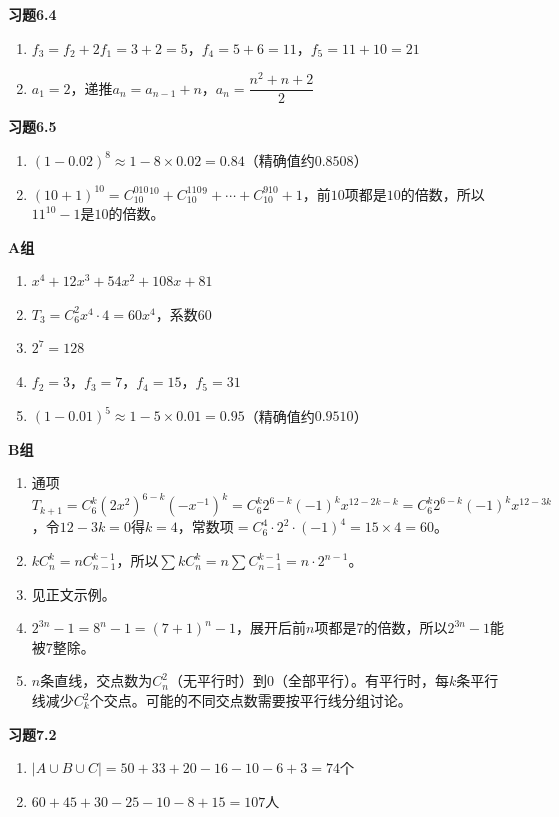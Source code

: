 \textbf{习题6.4}
\begin{enumerate}
\item $f_3=f_2+2f_1=3+2=5$，$f_4=5+6=11$，$f_5=11+10=21$
\item $a_1=2$，递推$a_n=a_{n-1}+n$，$a_n=\dfrac{n^2+n+2}{2}$
\end{enumerate}

\textbf{习题6.5}
\begin{enumerate}
\item $(1-0.02)^8\approx1-8\times0.02=0.84$（精确值约$0.8508$）
\item $(10+1)^{10}=C_{10}^010^{10}+C_{10}^110^9+\cdots+C_{10}^910+1$，前$10$项都是$10$的倍数，所以$11^{10}-1$是$10$的倍数。
\end{enumerate}

\textbf{A组}
\begin{enumerate}
\item $x^4+12x^3+54x^2+108x+81$
\item $T_{3}=C_6^2x^4\cdot4=60x^4$，系数$60$
\item $2^7=128$
\item $f_2=3$，$f_3=7$，$f_4=15$，$f_5=31$
\item $(1-0.01)^5\approx1-5\times0.01=0.95$（精确值约$0.9510$）
\end{enumerate}

\textbf{B组}
\begin{enumerate}
\item 通项$T_{k+1}=C_6^k(2x^2)^{6-k}(-x^{-1})^k=C_6^k2^{6-k}(-1)^kx^{12-2k-k}=C_6^k2^{6-k}(-1)^kx^{12-3k}$，令$12-3k=0$得$k=4$，常数项$=C_6^4\cdot2^2\cdot(-1)^4=15\times4=60$。
\item $kC_n^k=nC_{n-1}^{k-1}$，所以$\sum kC_n^k=n\sum C_{n-1}^{k-1}=n\cdot2^{n-1}$。
\item 见正文示例。
\item $2^{3n}-1=8^n-1=(7+1)^n-1$，展开后前$n$项都是$7$的倍数，所以$2^{3n}-1$能被$7$整除。
\item $n$条直线，交点数为$C_n^2$（无平行时）到$0$（全部平行）。有平行时，每$k$条平行线减少$C_k^2$个交点。可能的不同交点数需要按平行线分组讨论。
\end{enumerate}


\textbf{习题7.2}
\begin{enumerate}
\item $|A\cup B\cup C|=50+33+20-16-10-6+3=74$个
\item $60+45+30-25-10-8+15=107$人
\end{enumerate}

